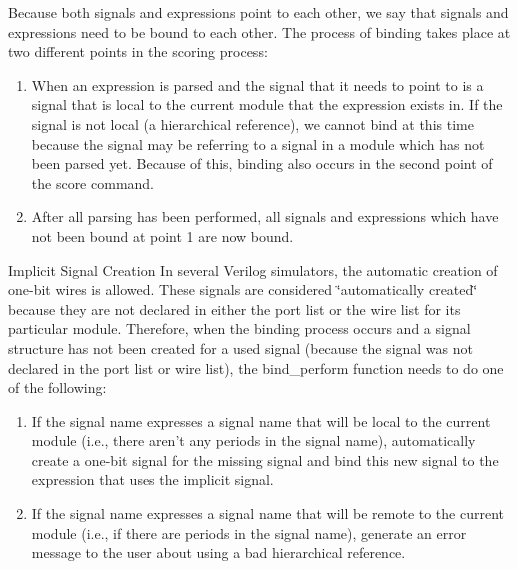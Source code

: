 \begin{Desc}
\item[]Because both signals and expressions point to each other, we say that signals and expressions need to be bound to each other. The process of binding takes place at two different points in the scoring process:\end{Desc}
\begin{Desc}
\item[]\begin{enumerate}
\item When an expression is parsed and the signal that it needs to point to is a signal that is local to the current module that the expression exists in. If the signal is not local (a hierarchical reference), we cannot bind at this time because the signal may be referring to a signal in a module which has not been parsed yet. Because of this, binding also occurs in the second point of the score command.\item After all parsing has been performed, all signals and expressions which have not been bound at point 1 are now bound.\end{enumerate}
\end{Desc}
\begin{Desc}
\item[Implicit Signal Creation]In several Verilog simulators, the automatic creation of one-bit wires is allowed. These signals are considered \char`\"{}automatically created\char`\"{} because they are not declared in either the port list or the wire list for its particular module. Therefore, when the binding process occurs and a signal structure has not been created for a used signal (because the signal was not declared in the port list or wire list), the bind\_\-perform function needs to do one of the following:\end{Desc}
\begin{Desc}
\item[]\begin{enumerate}
\item If the signal name expresses a signal name that will be local to the current module (i.e., there aren't any periods in the signal name), automatically create a one-bit signal for the missing signal and bind this new signal to the expression that uses the implicit signal.\item If the signal name expresses a signal name that will be remote to the current module (i.e., if there are periods in the signal name), generate an error message to the user about using a bad hierarchical reference.\end{enumerate}
\end{Desc}


